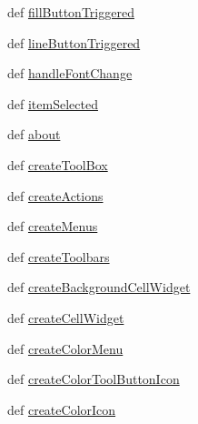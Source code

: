 \begin{DoxyCompactItemize}
\item 
def \hyperlink{classdiagramscene_1_1MainWindow_a34f976472a86740e68d4303ca4607afd}{fill\+Button\+Triggered}
\item 
def \hyperlink{classdiagramscene_1_1MainWindow_ae27f9a16c70cd46398874a08de20a21d}{line\+Button\+Triggered}
\item 
def \hyperlink{classdiagramscene_1_1MainWindow_a02e038ad11b41131d3f3a711169cf98a}{handle\+Font\+Change}
\item 
def \hyperlink{classdiagramscene_1_1MainWindow_a67e879bd865ef5bdd853c89ce49aa634}{item\+Selected}
\item 
def \hyperlink{classdiagramscene_1_1MainWindow_a509bb50f8d12b05c594124a5af858bc9}{about}
\item 
def \hyperlink{classdiagramscene_1_1MainWindow_ab3afe2f2f70f321f0d6deb275d116af7}{create\+Tool\+Box}
\item 
def \hyperlink{classdiagramscene_1_1MainWindow_ae49d3e79c587ec92c10ab40e6eb0e0ca}{create\+Actions}
\item 
def \hyperlink{classdiagramscene_1_1MainWindow_a6304930ff0c78fe6eee8d8651e906756}{create\+Menus}
\item 
def \hyperlink{classdiagramscene_1_1MainWindow_aa8f8eab4b800e9e18a7bee5eb4d1a043}{create\+Toolbars}
\item 
def \hyperlink{classdiagramscene_1_1MainWindow_aa5a8da4a442d751ef0b3853b4b0c1283}{create\+Background\+Cell\+Widget}
\item 
def \hyperlink{classdiagramscene_1_1MainWindow_a7319cc607ff4f542c51306cdb6fae465}{create\+Cell\+Widget}
\item 
def \hyperlink{classdiagramscene_1_1MainWindow_a3d2a1bc5ef5c1aa108cf254f0963336f}{create\+Color\+Menu}
\item 
def \hyperlink{classdiagramscene_1_1MainWindow_ad5dad6e6896354100e250d84d7375e45}{create\+Color\+Tool\+Button\+Icon}
\item 
def \hyperlink{classdiagramscene_1_1MainWindow_a7c829acf293003bea25fa1845d6224dd}{create\+Color\+Icon}
\end{DoxyCompactItemize}
